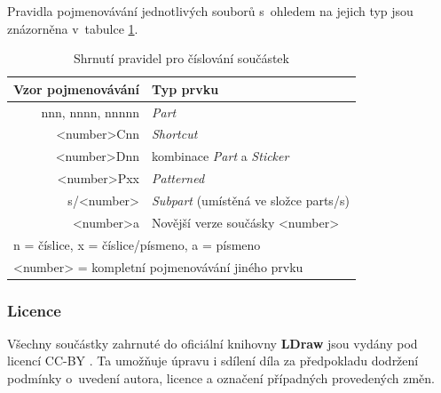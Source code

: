     Pravidla pojmenovávání jednotlivých souborů s~ohledem na jejich typ jsou znázorněna v~tabulce \ref{tabulka-ldraw-cislovani}.

    \begin{table}[th!]
    \centering
        \caption{Shrnutí pravidel pro číslování součástek \autocite{ldraw:numbering:faq}}
        \label{tabulka-ldraw-cislovani}
        \begin{tabularx}{\textwidth}{@{}rX@{}}
        \toprule
        Vzor pojmenovávání & Typ prvku
        \\ \midrule
        nnn, nnnn, nnnnn & \textit{Part}
        \\
        <number>Cnn & \textit{Shortcut}
        \\
        <number>Dnn & kombinace \textit{Part} a \textit{Sticker}
        \\
        <number>Pxx & \textit{Patterned} 
        \\
        s/<number> & \textit{Subpart} (umístěná ve složce parts/s)
        \\
        <number>a & Novější verze součásky <number>
         \\
        \bottomrule
        \multicolumn{2}{l}{n = číslice, x = číslice/písmeno, a = písmeno}
        \\
        \multicolumn{2}{l}{<number> = kompletní pojmenovávání jiného prvku}
        \end{tabularx}
    \end{table}

    \subsubsection{Licence}\label{ldraw-licence}
    Všechny součástky zahrnuté do oficiální knihovny \textbf{LDraw} jsou vydány pod licencí \gls{CC-BY} \autocite{CC-BY}. Ta umožňuje úpravu i sdílení díla za předpokladu dodržení podmínky o~uvedení autora, licence a označení případných provedených změn.

    
